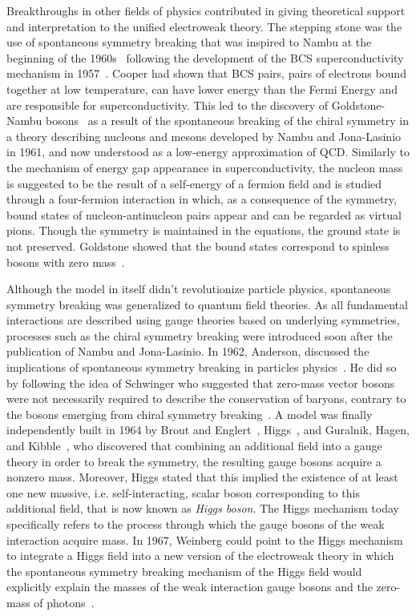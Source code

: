 	Breakthroughs in other fields of physics contributed in giving theoretical support and interpretation to the unified electroweak theory. The stepping stone was the use of spontaneous symmetry breaking that was inspired to Nambu at the beginning of the 1960s~\cite{NAMBU1961I,NAMBU1961II} following the development of the \acf{BCS} superconductivity mechanism in 1957~\cite{BCS1957}. Cooper had shown that BCS pairs, pairs of electrons bound together at low temperature, can have lower energy than the Fermi Energy and are responsible for superconductivity. This led to the discovery of Goldstone-Nambu bosons~\cite{NAMBU1960,GOLDSTONE1961} as a result of the spontaneous breaking of the chiral symmetry in a theory describing nucleons and mesons developed by Nambu and Jona-Lasinio in 1961, and now understood as a low-energy approximation of QCD. Similarly to the mechanism of energy gap appearance in superconductivity, the nucleon mass is suggested to be the result of a self-energy of a fermion field and is studied through a four-fermion interaction in which, as a consequence of the symmetry, bound states of nucleon-antinucleon pairs appear and can be regarded as virtual pions. Though the symmetry is maintained in the equations, the ground state is not preserved. Goldstone showed that the bound states correspond to spinless bosons with zero mass~\cite{GOLDSTONE1961}.
	
	Although the model in itself didn't revolutionize particle physics, spontaneous symmetry breaking was generalized to quantum field theories. As all fundamental interactions are described using gauge theories based on underlying symmetries, processes such as the chiral symmetry breaking were introduced soon after the publication of Nambu and Jona-Lasinio. In 1962, Anderson, discussed the implications of spontaneous symmetry breaking in particles physics~\cite{ANDERSON1963}. He did so by following the idea of Schwinger who suggested that zero-mass vector bosons were not necessarily required to describe the conservation of baryons, contrary to the bosons emerging from chiral symmetry breaking~\cite{SCHWINGER1962}. A model was finally independently built in 1964 by Brout and Englert~\cite{ENGLERT1964}, Higgs~\cite{HIGGS1964}, and Guralnik, Hagen, and Kibble~\cite{GURALNIK1964}, who discovered that combining an additional field into a gauge theory in order to break the symmetry, the resulting gauge bosons acquire a nonzero mass. Moreover, Higgs stated that this implied the existence of at least one new massive, i.e. self-interacting, scalar boson corresponding to this additional field, that is now known as \textit{Higgs boson}. The Higgs mechanism today specifically refers to the process through which the gauge bosons of the weak interaction acquire mass. In 1967, Weinberg could point to the Higgs mechanism to integrate a Higgs field into a new version of the electroweak theory in which the spontaneous symmetry breaking mechanism of the Higgs field would explicitly explain the masses of the weak interaction gauge bosons and the zero-mass of photons~\cite{WEINBERG1967}.
	
